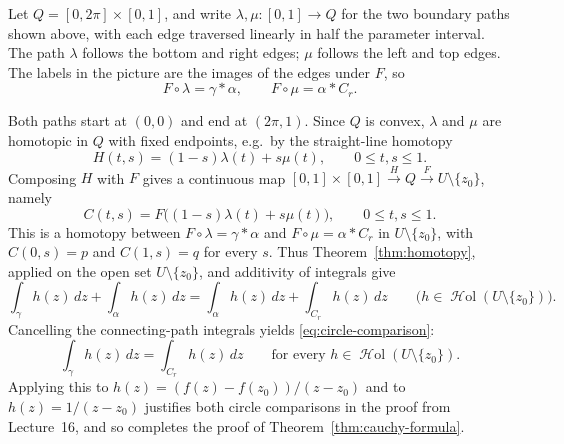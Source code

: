 \documentclass[11pt]{article}
\theoremstyle{plain}
\theoremstyle{definition}
\theoremstyle{remark}
\numberwithin{equation}{section}
\DeclareMathOperator{\Hol}{\mathcal{H}\mathrm{ol}}
\begin{document}
\begin{center}
\end{center}


Let $Q=[0,2\pi]\times[0,1]$, and write
$\lambda,\mu\colon[0,1]\to Q$ for the two boundary paths shown above,
with each edge traversed linearly in half the parameter interval.
The path $\lambda$ follows the bottom and right edges; $\mu$ follows
the left and top edges. The labels in the picture are the images of
the edges under $F$, so
\[
 F\circ\lambda=\gamma*\alpha,\qquad F\circ\mu=\alpha*C_r.
\]

Both paths start at $(0,0)$ and end at $(2\pi,1)$. Since $Q$ is convex,
$\lambda$ and $\mu$ are homotopic in $Q$ with fixed endpoints, e.g.\ by
the straight-line homotopy
\[
 H(t,s)=(1-s)\lambda(t)+s\mu(t),\qquad 0\leq t,s\leq1.
\]
Composing $H$ with $F$ gives a continuous map
$[0,1]\times[0,1]\xrightarrow{H}Q\xrightarrow{F}U\setminus\{z_0\}$,
namely
\[
 C(t,s)=F\bigl((1-s)\lambda(t)+s\mu(t)\bigr),
 \qquad 0\leq t,s\leq1.
\]
This is a homotopy between $F\circ\lambda=\gamma*\alpha$ and
$F\circ\mu=\alpha*C_r$ in $U\setminus\{z_0\}$, with
$C(0,s)=p$ and $C(1,s)=q$ for every $s$.
Thus Theorem~\ref{thm:homotopy}, applied on the open set
$U\setminus\{z_0\}$, and additivity of integrals give
\[
 \int_\gamma h(z)\,dz+\int_\alpha h(z)\,dz
 =\int_\alpha h(z)\,dz+\int_{C_r}h(z)\,dz
 \qquad\bigl(h\in\Hol(U\setminus\{z_0\})\bigr).
\]
Cancelling the connecting-path integrals yields
\eqref{eq:circle-comparison}:
\[
 \int_\gamma h(z)\,dz=\int_{C_r}h(z)\,dz
 \qquad\text{for every }h\in\Hol(U\setminus\{z_0\}).
\]
Applying this to $h(z)=(f(z)-f(z_0))/(z-z_0)$ and to $h(z)=1/(z-z_0)$
justifies both circle comparisons in the proof from Lecture~16, and so
completes the proof of Theorem~\ref{thm:cauchy-formula}.
%
%
%
\end{document}
